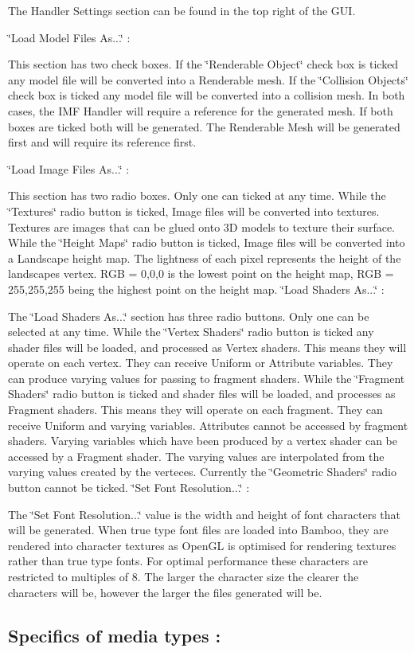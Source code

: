 The Handler Settings section can be found in the top right of the GUI. \par
 \char`\"{}Load Model Files As...\char`\"{} : \par
 This section has two check boxes. If the \char`\"{}Renderable Object\char`\"{} check box is ticked any model file will be converted into a Renderable mesh. If the \char`\"{}Collision Objects\char`\"{} check box is ticked any model file will be converted into a collision mesh. In both cases, the IMF Handler will require a reference for the generated mesh. If both boxes are ticked both will be generated. The Renderable Mesh will be generated first and will require its reference first. \par
 \char`\"{}Load Image Files As...\char`\"{} : \par
 This section has two radio boxes. Only one can ticked at any time. While the \char`\"{}Textures\char`\"{} radio button is ticked, Image files will be converted into textures. Textures are images that can be glued onto 3D models to texture their surface. While the \char`\"{}Height Maps\char`\"{} radio button is ticked, Image files will be converted into a Landscape height map. The lightness of each pixel represents the height of the landscapes vertex. RGB = 0,0,0 is the lowest point on the height map, RGB = 255,255,255 being the highest point on the height map. \char`\"{}Load Shaders As...\char`\"{} : \par
 The \char`\"{}Load Shaders As...\char`\"{} section has three radio buttons. Only one can be selected at any time. While the \char`\"{}Vertex Shaders\char`\"{} radio button is ticked any shader files will be loaded, and processed as Vertex shaders. This means they will operate on each vertex. They can receive Uniform or Attribute variables. They can produce varying values for passing to fragment shaders. While the \char`\"{}Fragment Shaders\char`\"{} radio button is ticked and shader files will be loaded, and processes as Fragment shaders. This means they will operate on each fragment. They can receive Uniform and varying variables. Attributes cannot be accessed by fragment shaders. Varying variables which have been produced by a vertex shader can be accessed by a Fragment shader. The varying values are interpolated from the varying values created by the verteces. Currently the \char`\"{}Geometric Shaders\char`\"{} radio button cannot be ticked. \char`\"{}Set Font Resolution...\char`\"{} : \par
 The \char`\"{}Set Font Resolution...\char`\"{} value is the width and height of font characters that will be generated. When true type font files are loaded into Bamboo, they are rendered into character textures as OpenGL is optimised for rendering textures rather than true type fonts. For optimal performance these characters are restricted to multiples of 8. The larger the character size the clearer the characters will be, however the larger the files generated will be. \hypertarget{_using_engine_page_IMFTypes}{}\subsection{Specifics of media types :}\label{_using_engine_page_IMFTypes}
